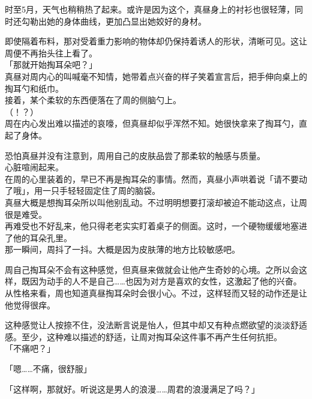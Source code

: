 时至5月，天气也稍稍热了起来。或许是因为这个，真昼身上的衬衫也很轻薄，同时还勾勒出她的身体曲线，更加凸显出她姣好的身材。

即使隔着布料，那对受着重力影响的物体却仍保持着诱人的形状，清晰可见。这让周便不再抬头往上看了。\\

「那就开始掏耳朵吧？」\\

真昼对周内心的叫喊毫不知情，她带着点兴奋的样子笑着宣言后，把手伸向桌上的掏耳勺和纸巾。\\

接着，某个柔软的东西便落在了周的侧脑勺上。\\

（！？）\\

周在内心发出难以描述的哀嚎，但真昼却似乎浑然不知。她很快拿来了掏耳勺，直起了身体。

恐怕真昼并没有注意到，周用自己的皮肤品尝了那柔软的触感与质量。\\

心脏喧闹起来。\\

在周的心里装着的，早已不再是掏耳朵的事情。然而，真昼小声哄着说「请不要动了哦」，用一只手轻轻固定住了周的脑袋。\\

真昼大概是想掏耳朵所以叫他别乱动。不过明明想要打滚却被迫不能动这点，让周很是难受。\\

再难受也不好乱来，他只得老老实实盯着桌子的侧面。这时，一个硬物缓缓地塞进了他的耳朵孔里。\\

那一瞬间，周抖了一抖。大概是因为皮肤薄的地方比较敏感吧。

周自己掏耳朵不会有这种感觉，但真昼来做就会让他产生奇妙的心境。之所以会这样，既因为动手的人不是自己……也因为对方是喜欢的女性，这激起了他的兴奋。\\

从性格来看，周也知道真昼掏耳朵时会很小心。不过，这样轻而又轻的动作还是让他觉得很痒。

这种感觉让人按捺不住，没法断言说是怡人，但其中却又有种点燃欲望的淡淡舒适感。至少，这种难以描述的舒适，让周对掏耳朵这件事不再产生任何抗拒。\\

「不痛吧？」

「嗯……不痛，很舒服」

「这样啊，那就好。听说这是男人的浪漫……周君的浪漫满足了吗？」


